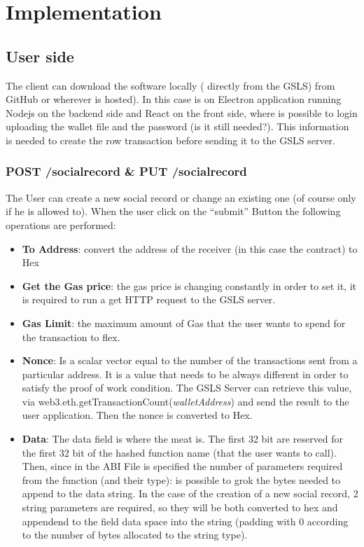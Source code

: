 \chapter{Implementation}
\label{implementation}


\section{User side}

The client can download the software locally ( directly from the GSLS) from GitHub or wherever is hosted).
In this case is on Electron application running Nodejs on the backend side and React on the front side, where is possible to login uploading the wallet file and the password (is it still needed?).
This information is needed to create the row transaction before sending it to the GSLS server.


\subsection{POST /socialrecord \& PUT /socialrecord}
The User can create a new social record or change an existing one (of course only if he is allowed to).
When the user click on the “submit” Button the following operations are performed:

\begin{itemize}
  \item \textbf{To Address}: convert the address of the receiver (in this case the contract) to Hex
  \item \textbf{Get the Gas price}: the gas price is changing constantly in order to set it, it is required to run a get HTTP request to the GSLS server.
  \item \textbf{Gas Limit}: the maximum amount of Gas that the user wants to spend for the transaction to flex.
  \item \textbf{Nonce}: Is a scalar vector equal to the number of the transactions sent from a particular address. It is a value that needs to be always different in order to satisfy the proof of work condition.
  The GSLS Server can retrieve this value, via web3.eth.getTransactionCount(\textit{walletAddress}) and send the result to the user application. Then the nonce is converted to Hex.
  \item \textbf{Data}: The data field is where the meat is. The first 32 bit are reserved for the first 32 bit of the hashed function name (that the user wants to call).
  Then, since in the ABI File is specified the number of parameters required from the function (and their type): is possible to grok the bytes needed to append to the data string.
  In the case of the creation of a new social record, 2 string parameters are required, so they will be both converted to hex and appendend to the field data space into the string (padding with 0 according to the number of bytes allocated to the string type).
\end{itemize}

